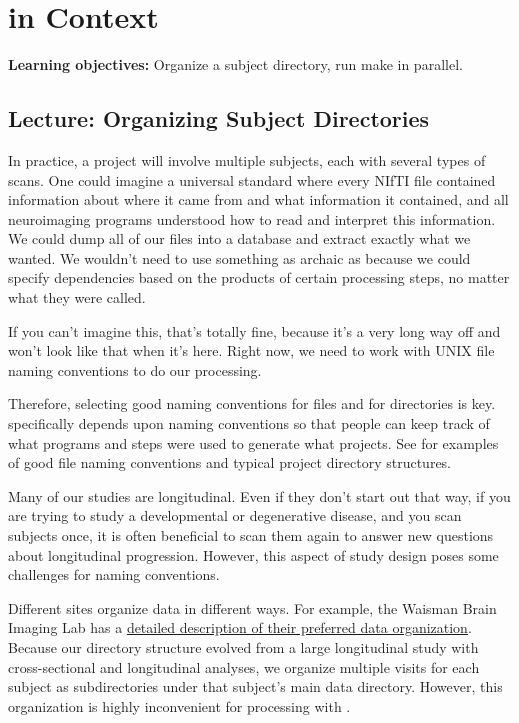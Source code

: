 \chapter{\maken{} in Context}
\label{sec:practicum2}

\textbf{Learning objectives:} Organize a subject directory, run make
in parallel.

\section{Lecture: Organizing Subject Directories}

In practice, a project will involve multiple subjects, each with
several types of scans. One could imagine a universal standard where
every NIfTI file contained information about where it came from and
what information it contained, and all neuroimaging programs
understood how to read and interpret this information. We could dump
all of our files into a database and extract exactly what we
wanted. We wouldn't need to use something as archaic as \maken{} because
we could specify dependencies based on the products of certain
processing steps, no matter what they were called.

If you can't imagine this, that's totally fine, because it's a very
long way off and won't look like that when it's here. Right now, we
need to work with UNIX file naming conventions to do our processing.

Therefore, selecting good naming conventions for files and for
directories is key. \maken{} specifically depends upon naming
conventions so that people can keep track of what programs and steps
were used to generate what projects. See  for examples of good file naming conventions and typical project directory structures. 


Many of our studies are longitudinal. Even if they don't start out
that way, if you are trying to study a developmental or degenerative
disease, and you scan subjects once, it is often beneficial to scan
them again to answer new questions about longitudinal
progression. However, this aspect of study design poses some
challenges for naming conventions. 

Different sites organize data in different ways. For example, the
Waisman Brain Imaging Lab has a \href{http://brainimaging.waisman.wisc.edu/~oakes/teaching/directory_structure.html}{detailed description of their
preferred data organization}. 
Because our directory structure evolved from a large longitudinal
study with cross-sectional and longitudinal analyses, we
organize multiple visits for each subject as subdirectories under that
subject's main data directory. However, this organization is highly
inconvenient for processing with \maken{}.  


